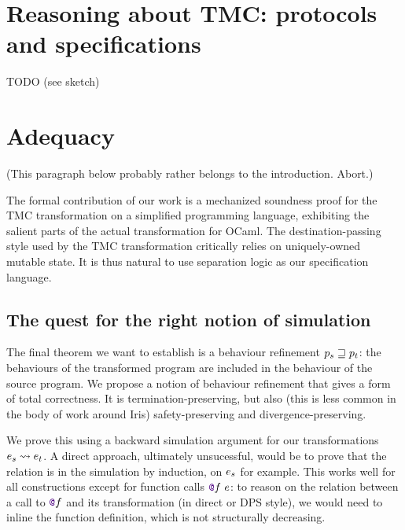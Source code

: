 \section{Reasoning about TMC: protocols and specifications}
\label{sec:TMC_protocols_and_specs}

TODO (see sketch)

\section{Adequacy}
\label{sec:soundness}
\label{sec:adequacy}

(This paragraph below probably rather belongs to the introduction. Abort.)

The formal contribution of our work is a mechanized soundness proof for the TMC transformation on a simplified programming language, exhibiting the salient parts of the actual transformation for OCaml.
%
The destination-passing style used by the TMC transformation critically relies on uniquely-owned mutable state.
%
It is thus natural to use separation logic as our specification language.

\subsection{The quest for the right notion of simulation}
\label{sec:howto-relation}

The final theorem we want to establish is a behaviour refinement $\datalangProg_s \refined \datalangProg_t$: the behaviours of the transformed program are included in the behaviour of the source program.
%
We propose a notion of behaviour refinement that gives a form of total correctness.
%
It is termination-preserving, but also (this is less common in the body of work around Iris) safety-preserving and divergence-preserving.

We prove this using a backward simulation argument for our transformations $\datalangExpr_s \tmc \datalangExpr_t$.
%
A direct approach, ultimately unsucessful, would be to prove that the relation is in the simulation by induction, on $\datalangExpr_s$ for example.
%
This works well for all constructions except for function calls $\datalangCall{\datalangFnptr{\datalangFn}}{\datalangExpr}$: to reason on the relation between a call to $\datalangFnptr{\datalangFn}$ and its transformation (in direct or DPS style), we would need to inline the function definition, which is not structurally decreasing.

